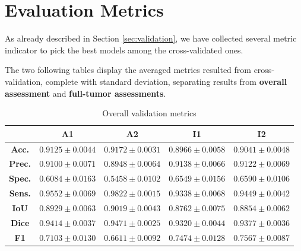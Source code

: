 
\section{Evaluation Metrics}

As already described in Section \ref{sec:validation}, we have collected several metric indicator to pick the best models among the cross-validated ones.

The two following tables display the averaged metrics resulted from cross-validation, complete with standard deviation, separating results from \textbf{overall assessment} and \textbf{full-tumor assessments}.

\begin{table}[H]
\centering
\begin{tabular}{|c|c|c|c|c|}
\hline 
& \textbf{A1} & \textbf{A2} & \textbf{I1} & \textbf{I2}
\\ \hline \hline
\textbf{Acc.} & $0.9125 \pm 0.0044$ & \textcolor{mygreen}{$0.9172 \pm 0.0031$} & \textcolor{myred}{$0.8966 \pm 0.0058$} & $0.9041 \pm 0.0048$
\\ \hline
\textbf{Prec.} & $0.9100 \pm 0.0071$ & \textcolor{myred}{$0.8948 \pm 0.0064$} & \textcolor{mygreen}{$0.9138 \pm 0.0066$} & $0.9122 \pm 0.0069$
\\ \hline
\textbf{Spec.} & $0.6084 \pm 0.0163$ & \textcolor{myred}{$0.5458 \pm 0.0102$} & $0.6549 \pm 0.0156$ & \textcolor{mygreen}{$0.6590 \pm 0.0106$}
\\ \hline
\textbf{Sens.} & $0.9552 \pm 0.0069$ & \textcolor{mygreen}{$0.9822 \pm 0.0015$} & \textcolor{myred}{$0.9338 \pm 0.0068$} & $0.9449 \pm 0.0042$
\\ \hline
\textbf{IoU} & $0.8929 \pm 0.0063$ & \textcolor{mygreen}{$0.9019 \pm 0.0043$} & \textcolor{myred}{$0.8762 \pm 0.0075$} & $0.8854 \pm 0.0062$
\\ \hline
\textbf{Dice} & $0.9414 \pm 0.0037$ & \textcolor{mygreen}{$0.9471 \pm 0.0025$} & \textcolor{myred}{$0.9320 \pm 0.0044$} & $0.9377 \pm 0.0036$
\\ \hline
\textbf{F1} & $0.7103 \pm 0.0130$ & \textcolor{myred}{$0.6611 \pm 0.0092$} & $0.7474 \pm 0.0128$ & \textcolor{mygreen}{$0.7567 \pm 0.0087$}
\\ \hline
\end{tabular}
\caption{Overall validation metrics}
\end{table}

